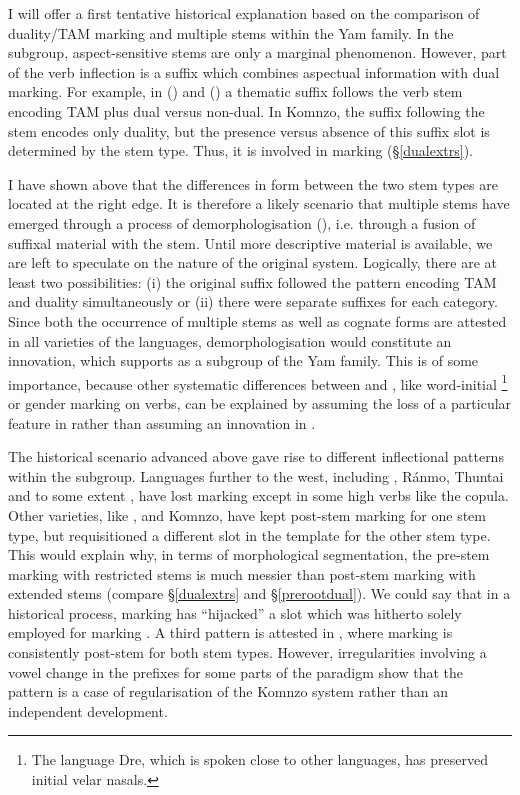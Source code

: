 I will offer a first tentative historical explanation based on the comparison of duality/TAM marking and multiple stems within the Yam family. In the  subgroup, aspect-sensitive stems are only a marginal phenomenon. However, part of the verb inflection is a suffix which combines aspectual information with dual marking. For example, in  (\citealt{Evans:2015to}) and  (\citealt{Siegel:2015bp}) a thematic suffix follows the verb stem encoding TAM plus dual versus non-dual. In Komnzo, the suffix following the stem encodes only duality, but the presence versus absence of this suffix slot is determined by the stem type. Thus, it is involved in marking  ({\S}\ref{dualextrs}).

I have shown above that the differences in form between the two stem types are located at the right edge. It is therefore a likely scenario that multiple stems have emerged through a process of demorphologisation (\citealt[154]{Hopper:1990vm}), i.e. through a fusion of suffixal material with the stem. Until more descriptive material is available, we are left to speculate on the nature of the original system. Logically, there are at least two possibilities: (i) the original suffix followed the  pattern encoding TAM and duality simultaneously or (ii) there were separate suffixes for each category. Since both the occurrence of multiple stems as well as cognate forms are attested in all varieties of the  languages, demorphologisation would constitute an innovation, which supports  as a subgroup of the Yam family. This is of some importance, because other systematic differences between  and , like word-initial  \footnote{The  language Dre, which is spoken close to other  languages, has preserved initial velar nasals.} or gender marking on verbs, can be explained by assuming the loss of a particular feature in  rather than assuming an innovation in .

The historical scenario advanced above gave rise to different inflectional patterns within the  subgroup. Languages further to the west, including , Ránmo,  Thuntai and to some extent , have lost  marking except in some high  verbs like the copula. Other varieties, like ,  and Komnzo, have kept post-stem  marking for one stem type, but requisitioned a different slot in the template for the other stem type. This would explain why, in terms of morphological segmentation, the pre-stem  marking with restricted stems is much messier than post-stem  marking with extended stems (compare {\S}\ref{dualextrs} and {\S}\ref{prerootdual}). We could say that in a historical process,  marking has ``hijacked'' a slot which was hitherto solely employed for marking . A third pattern is attested in , where  marking is consistently post-stem for both stem types. However, irregularities involving a vowel change in the prefixes for some parts of the paradigm show that the  pattern is a case of regularisation of the Komnzo system rather than an independent development.

